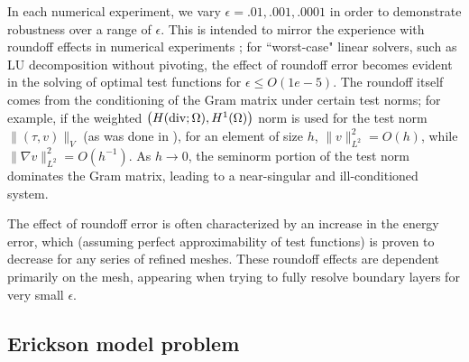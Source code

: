\documentclass[11pt,onecolumn]{scrartcl}
\newcommand{\grad}{\nabla}
\begin{document}


In each numerical experiment, we vary $\epsilon = .01, .001, .0001$ in order to demonstrate robustness over a range of $\epsilon$.  This is intended to mirror the experience with roundoff effects in numerical experiments \cite{DPGrobustness}; for ``worst-case" linear solvers, such as LU decomposition without pivoting, the effect of roundoff error becomes evident in the solving of optimal test functions for $\epsilon \leq O(1e-5)$.  The roundoff itself comes from the conditioning of the Gram matrix under certain test norms; for example, if the weighted $\left(H({\rm div};\Omega), H^1(\Omega)\right)$ norm is used for the test norm $\|\left(\tau,v\right)\|_V$ (as was done in \cite{DPG2}), for an element of size $h$, $\|v\|_{L^2}^2 = O(h)$, while $\|\grad v\|_{L^2}^2 = O(h^{-1})$. As $h\rightarrow 0$, the seminorm portion of the test norm dominates the Gram matrix, leading to a near-singular and ill-conditioned system. 

The effect of roundoff error is often characterized by an increase in the energy error, which (assuming perfect approximability of test functions) is proven to decrease for any series of refined meshes. These roundoff effects are dependent primarily on the mesh, appearing when trying to fully resolve boundary layers for very small $\epsilon$. 


\subsection{Erickson model problem}
\end{document}
